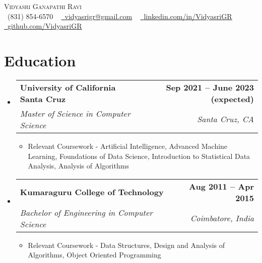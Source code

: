 \documentclass[letterpaper,10.5pt]{article}
\makeatletter
\newcommand{\resumeItem}[1]{
  \item\small{
    {#1 \vspace{-2pt}}
  }
}
\newcommand{\resumeSubheading}[4]{
  \vspace{-2pt}\item
    \begin{tabular*}{1.0\textwidth}[t]{l@{\extracolsep{\fill}}r}
      \textbf{#1} & \textbf{\small #2} \\
      \textit{\small#3} & \textit{\small #4} \\
    \end{tabular*}\vspace{-7pt}
}
\newcommand{\resumeSubHeadingListStart}{\begin{itemize}[leftmargin=0.0in, label={}]}
\newcommand{\resumeSubHeadingListEnd}{\end{itemize}}
\newcommand{\resumeItemListStart}{\begin{itemize}}
\newcommand{\resumeItemListEnd}{\end{itemize}\vspace{-5pt}}
\makeatother
\begin{document}

\begin{center} 
    {\huge \scshape Vidyasri Ganapathi Ravi} \\ \vspace{1pt}
    \small \raisebox{-0.1\height}\faPhone\ (831) 854-6570 ~ \href{vidyasrigravi@gmail.com}{\raisebox{-0.2\height}\faEnvelope\  \underline{vidyasrigr@gmail.com}} ~ 
    \href{https://www.linkedin.com/in/vidyasri-gr/}{\raisebox{-0.2\height}\faLinkedin\ \underline{linkedin.com/in/VidyasriGR}}  ~
    \href{https://github.com/vidyasrigr}{\raisebox{-0.2\height}\faGithub\ \underline{github.com/VidyasriGR}}
    \vspace{-8pt}
\end{center}


\section{Education}
  \resumeSubHeadingListStart
    \resumeSubheading
      {University of California Santa Cruz}{Sep 2021 -- June 2023 (expected)}
      {Master of Science in Computer Science}{Santa Cruz, CA}
      \resumeItemListStart
        \resumeItem{Relevant Coursework - Artificial Intelligence, Advanced Machine Learning, Foundations of Data Science, Introduction to Statistical Data Analysis, Analysis of Algorithms}
    \resumeItemListEnd
    \resumeSubheading
      {Kumaraguru College of Technology}{Aug 2011 -- Apr 2015}
      {Bachelor of Engineering in Computer Science}{Coimbatore, India}
      \resumeItemListStart
        \resumeItem{Relevant Coursework - Data Structures, Design and Analysis of Algorithms, Object Oriented Programming}
    \resumeItemListEnd
  \resumeSubHeadingListEnd
\end{document}
